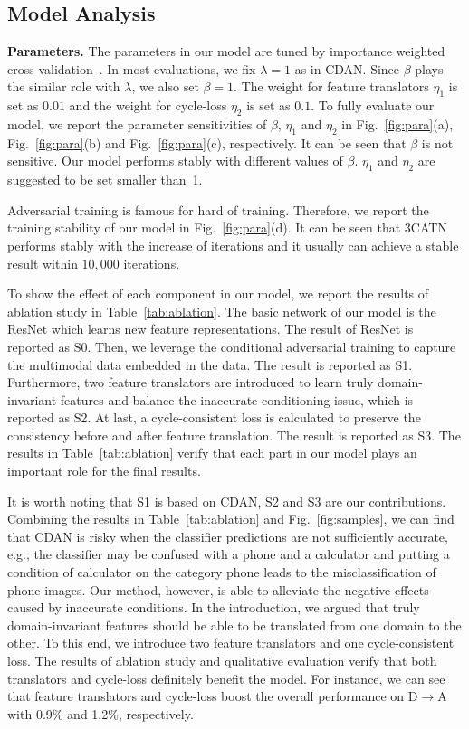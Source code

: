 \documentclass[sigconf]{acmart}
\begin{document}
\subsection{Model Analysis}
{\bf Parameters.} The parameters in our model are tuned by importance weighted cross validation~\cite{sugiyama2007covariate}. In most evaluations, we fix $\lambda=1$ as in CDAN. Since $\beta$ plays the similar role with $\lambda$, we also set $\beta=1$. The weight for feature translators $\eta_1$ is set as $0.01$ and the weight for cycle-loss $\eta_2$ is set as $0.1$. To fully evaluate our model, we report the parameter sensitivities of $\beta$, $\eta_1$ and $\eta_2$ in Fig.~\ref{fig:para}(a), Fig.~\ref{fig:para}(b) and Fig.~\ref{fig:para}(c), respectively. It can be seen that $\beta$ is not sensitive. Our model performs stably with different values of $\beta$. $\eta_1$ and $\eta_2$ are suggested to be set smaller than~1.

 Adversarial training is famous for hard of training. Therefore, we report the training stability of our model in Fig.~\ref{fig:para}(d). It can be seen that 3CATN performs stably with the increase of iterations and it usually can achieve a stable result within $10,000$ iterations.

 To show the effect of each component in our model, we report the results of ablation study in Table~\ref{tab:ablation}. The basic network of our model is the ResNet which learns new feature representations. The result of ResNet is reported as S0. Then, we leverage the conditional adversarial training to capture the multimodal data embedded in the data. The result is reported as S1. Furthermore, two feature translators are introduced to learn truly domain-invariant features and balance the inaccurate conditioning issue, which is reported as S2. At last, a cycle-consistent loss is calculated to preserve the consistency before and after feature translation. The result is reported as S3. The results in Table~\ref{tab:ablation} verify that each part in our model plays an important role for the final results. 

It is worth noting that S1 is based on CDAN, S2 and S3 are our contributions. Combining the results in Table~\ref{tab:ablation} and Fig.~\ref{fig:samples}, we can find that CDAN is risky when the classifier predictions are not sufficiently accurate, e.g., the classifier may be confused with a phone and a calculator and putting a condition of calculator on the category phone leads to the misclassification of phone images. Our method, however, is able to alleviate the negative effects caused by inaccurate conditions. In the introduction, we argued that truly domain-invariant features should be able to be translated from one domain to the other. To this end, we introduce two feature translators and one cycle-consistent loss. The results of ablation study and qualitative evaluation verify that both translators and cycle-loss definitely benefit the model. For instance, we can see that feature translators and cycle-loss boost the overall performance on D$\rightarrow$A with 0.9\% and 1.2\%, respectively.
\end{document}

